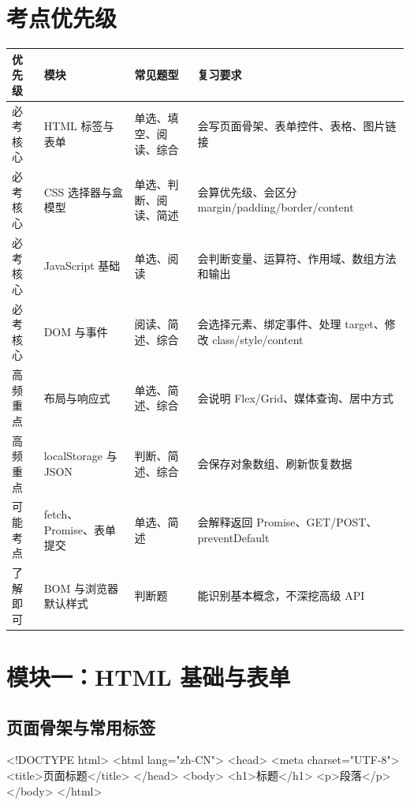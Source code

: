 \documentclass[UTF8,zihao=-4]{ctexart}
\begin{document}
\section{考点优先级}

\begin{longtable}{p{}p{}p{}p{}}
\toprule
\textbf{优先级} & \textbf{模块} & \textbf{常见题型} & \textbf{复习要求} \\
\midrule
必考核心 & HTML 标签与表单 & 单选、填空、阅读、综合 & 会写页面骨架、表单控件、表格、图片链接 \\
必考核心 & CSS 选择器与盒模型 & 单选、判断、阅读、简述 & 会算优先级、会区分 margin/padding/border/content \\
必考核心 & JavaScript 基础 & 单选、阅读 & 会判断变量、运算符、作用域、数组方法和输出 \\
必考核心 & DOM 与事件 & 阅读、简述、综合 & 会选择元素、绑定事件、处理 target、修改 class/style/content \\
高频重点 & 布局与响应式 & 单选、简述、综合 & 会说明 Flex/Grid、媒体查询、居中方式 \\
高频重点 & localStorage 与 JSON & 判断、简述、综合 & 会保存对象数组、刷新恢复数据 \\
可能考点 & fetch、Promise、表单提交 & 单选、简述 & 会解释返回 Promise、GET/POST、preventDefault \\
了解即可 & BOM 与浏览器默认样式 & 判断题 & 能识别基本概念，不深挖高级 API \\
\bottomrule
\end{longtable}

\section{模块一：HTML 基础与表单}

\subsection{页面骨架与常用标签}
\begin{keybox}[必须会写的骨架]
\begin{Code}
<!DOCTYPE html>
<html lang="zh-CN">
<head>
  <meta charset="UTF-8">
  <title>页面标题</title>
</head>
<body>
  <h1>标题</h1>
  <p>段落</p>
</body>
</html>
\end{Code}
\end{keybox}
\end{document}
